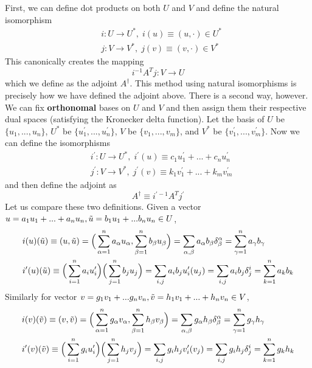   First, we can define dot products on both $U$ and $V$ and define the natural isomorphism 
  \begin{align*}
    &i: U \longrightarrow U^\ast, \; i(u) \equiv (u, \cdot) \in U^\ast\\
    &j: V \longrightarrow V^\ast, \; j(v) \equiv (v, \cdot) \in V^\ast
  \end{align*}
  This canonically creates the mapping 
  \begin{equation}
    i^{-1} A^T j: V \longrightarrow U
  \end{equation}
  which we define as the adjoint $A^\dagger$. This method using natural isomorphisms is precisely how we have defined the adjoint above. There is a second way, however. We can fix \textbf{orthonomal} bases on $U$ and $V$ and then assign them their respective dual spaces (satisfying the Kronecker delta function). Let the basis of $U$ be $\{u_1, ..., u_n\}$, $U^\ast$ be $\{u_1^\prime, ..., u_n^\prime\}$, $V$ be $\{v_1, ..., v_m\}$, and $V^\ast$ be $\{v_1^\prime, ..., v_m^\prime\}$. Now we can define the isomorphisms 
  \begin{align*}
    & i^\prime: U \longrightarrow U^\ast, \; i^\prime (u) \equiv c_1 u_1^\prime + ... + c_n u_n^\prime \\
    & j^\prime: V \longrightarrow V^\ast, \; j^\prime (v) \equiv k_1 v_1^\prime + ... + k_m v_m^\prime
  \end{align*}
  and then define the adjoint as 
  \begin{equation}
    A^\dagger \equiv i^{\prime -1} A^T j^\prime
  \end{equation}
  Let us compare these two definitions. Given a vector $u = a_1 u_1 + ... + a_n u_n, \Tilde{u} = b_1 u_1 + ... b_n u_n \in U$, 
  \begin{align*}
    &i(u)(\Tilde{u}) \equiv (u, \Tilde{u}) = \Big(\sum_{\alpha = 1}^n a_\alpha u_\alpha, \sum_{\beta = 1}^n b_\beta u_\beta \Big) = \sum_{\alpha, \beta} a_\alpha b_\beta \delta^\alpha_\beta = \sum_{\gamma=1}^n a_\gamma b_\gamma \\
    &i^\prime(u)(\Tilde{u}) \equiv \Big(\sum_{i=1}^n a_i u_i^\prime \Big) \Big( \sum_{j=1}^n b_j u_j \Big) = \sum_{i, j} a_i b_j u_i^\prime (u_j) = \sum_{i, j} a_i b_j \delta^i_j = \sum_{k=1}^n a_k b_k
  \end{align*}
  Similarly for vector $v = g_1 v_1 + ... g_n v_n, \Tilde{v} = h_1 v_1 + ... + h_n v_n \in V$, 
  \begin{align*}
    &i(v)(\Tilde{v}) \equiv (v, \Tilde{v}) = \Big(\sum_{\alpha = 1}^n g_\alpha v_\alpha, \sum_{\beta = 1}^n h_\beta v_\beta \Big) = \sum_{\alpha, \beta} g_\alpha h_\beta \delta^\alpha_\beta = \sum_{\gamma=1}^n g_\gamma h_\gamma \\
    &i^\prime(v)(\Tilde{v}) \equiv \Big(\sum_{i=1}^n g_i u_i^\prime \Big) \Big( \sum_{j=1}^n h_j v_j \Big) = \sum_{i, j} g_i h_j v_i^\prime (v_j) = \sum_{i, j} g_i h_j \delta^i_j = \sum_{k=1}^n g_k h_k
  \end{align*}
